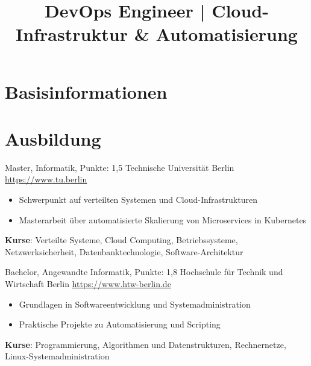 \documentclass[a4paper, serif, 10pt]{moderncv}
\title{DevOps Engineer | Cloud-Infrastruktur \& Automatisierung}
\begin{document}
\maketitle

\section{Basisinformationen}

\section{Ausbildung}

        {Master, Informatik, Punkte: 1,5}
        {Technische Universität Berlin}
        {\url{https://www.tu.berlin}}
        {}
        {\begin{itemize}
\item Schwerpunkt auf verteilten Systemen und Cloud-Infrastrukturen
\item Masterarbeit über automatisierte Skalierung von Microservices in Kubernetes
\end{itemize}
\textbf{Kurse}: Verteilte Systeme, Cloud Computing, Betriebssysteme, Netzwerksicherheit, Datenbanktechnologie, Software-Architektur}

        {Bachelor, Angewandte Informatik, Punkte: 1,8}
        {Hochschule für Technik und Wirtschaft Berlin}
        {\url{https://www.htw-berlin.de}}
        {}
        {\begin{itemize}
\item Grundlagen in Softwareentwicklung und Systemadministration
\item Praktische Projekte zu Automatisierung und Scripting
\end{itemize}
\textbf{Kurse}: Programmierung, Algorithmen und Datenstrukturen, Rechnernetze, Linux-Systemadministration}
\end{document}
